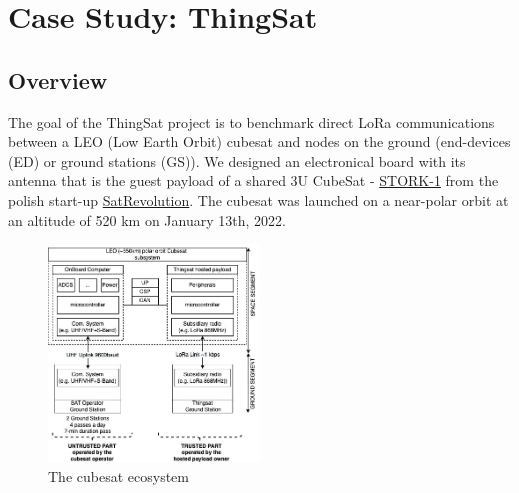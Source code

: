 \section{Case Study: ThingSat}
\label{sec:case-study}

\subsection{Overview}



The goal of the ThingSat project is to benchmark direct LoRa communications
between a LEO (Low Earth Orbit) cubesat and nodes on the ground (end-devices
(ED) or ground stations (GS)). We designed an electronical board with its
antenna that is the guest payload of a shared 3U CubeSat -
\href{https://space.skyrocket.de/doc_sdat/stork-1.htm}{STORK-1} from the polish
start-up \href{https://www.satrevolution.com/}{SatRevolution}. The cubesat was
launched on a near-polar orbit at an altitude of 520 km on January 13th, 2022. 

\begin{figure}[ht]
    \includegraphics[width=0.5\textwidth]{Figures/globecom-thingsat.jpg}
    \caption{The cubesat ecosystem}
    \label{fig:archi}
\end{figure}

